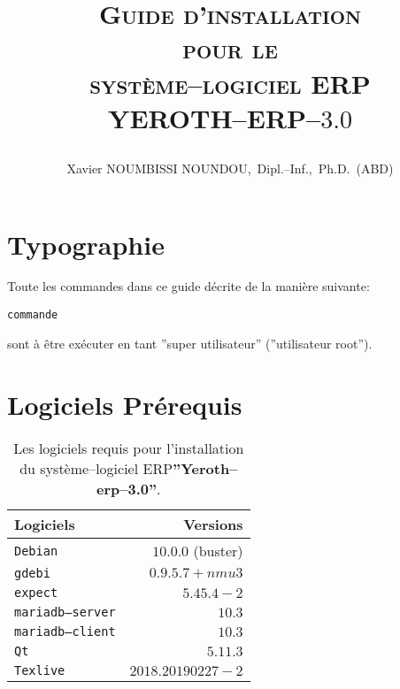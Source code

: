 \documentclass[a4paper, 10pt]{article}
\newcommand{\yerotherptroiszero}{\textbf{''Yeroth--erp--3.0''}\xspace}
\newcommand{\texlive}{\texttt{Texlive}\xspace}
\newcommand{\gdebi}{\texttt{gdebi}\xspace}
\newcommand{\expect}{\texttt{expect}\xspace}
\newcommand{\debian}{\texttt{Debian}\xspace}
\newcommand{\qt}{\texttt{Qt}\xspace}
\newcommand{\mariadbserver}{\texttt{mariadb--server}\xspace}
\newcommand{\mariadbclient}{\texttt{mariadb--client}\xspace}
\newcommand{\yerotherp}{\textcolor{yerenColorBlue}{\sc YEROTH--ERP--$3.0$}\xspace}
\newcommand{\erp}{syst\`eme--logiciel ERP\xspace}
\newcommand{\myfullacademicname}{Xavier NOUMBISSI NOUNDOU,~Dipl.--Inf.,~Ph.D.~(ABD)\xspace}
\newcommand{\rootcommand}[1]{\textcolor{purplish}{#1\xspace}}
\begin{document}

\title{
\vspace{-1.65em}
\textcolor{medgreen}{\textsc{Guide d'installation \\
										pour le \\
									 \erp \\ \vspace{1em}
									 \yerotherp}}
									 \author{\myfullacademicname}
}

\date{} 
\maketitle
\thispagestyle{fancy}


\vspace{0.25cm}

\section{Typographie}

Toute les commandes dans ce guide d\'ecrite
de la mani\`ere suivante:
	\begin{alltt}
		\rootcommand{commande}
	\end{alltt}
sont \`a \^etre ex\'ecuter en tant
''super utilisateur'' (''utilisateur root'').

\section{Logiciels Pr\'erequis}

\begin{table}[!htbp]
\centering
\begin{tabular}{l|r}
\textbf{Logiciels}	&
\textbf{Versions}	\\ \hline
\debian				&
$10.0.0$ (buster)	\\ \hline
\gdebi				&
$0.9.5.7+nmu3$		\\ \hline
\expect				&
$5.45.4-2$			\\ \hline
\mariadbserver		&
$10.3$				\\ \hline
\mariadbclient		&
$10.3$				\\ \hline
\qt					&
$5.11.3$			\\ \hline	
\texlive			&
$2018.20190227-2$	\\ 			
\end{tabular}
\caption{Les logiciels requis pour l'installation du
	 	\erp \yerotherptroiszero.}
\label{tab:dependance-logiciel}
\end{table}
\end{document}
